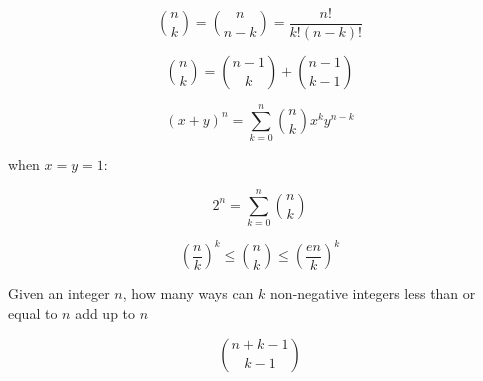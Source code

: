 $$ \binom{n}{k} = \binom{n}{n - k} = \frac{n!}{k!(n - k)!} $$

$$ \binom{n}{k} = \binom{n - 1}{k} + \binom{n - 1}{k - 1} $$

$$ (x + y) ^ n = \sum_{k = 0}^{n} {\binom{n}{k} x ^ k y ^ {n - k}} $$

when $x = y = 1$:

$$ 2 ^ n = \sum_{k = 0}^{n} {\binom{n}{k}} $$

$$ (\frac{n}{k})^k \leq \binom{n}{k} \leq(\frac{en}{k})^k $$

Given an integer $n$, how many ways can $k$ non-negative integers less than or equal to $n$ add up to $n$

$$ \binom{n + k - 1}{k - 1} $$